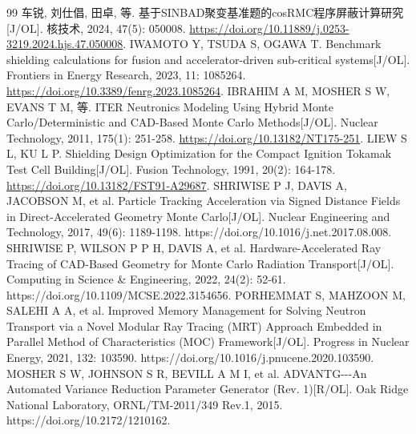 \documentclass[UTF8, zihao=-4, fontset=none, a4paper]{ctexart}
\begin{document}
\begin{thebibliography}{99}
 车锐, 刘仕倡, 田卓, 等. 基于SINBAD聚变基准题的cosRMC程序屏蔽计算研究{[}J/OL{]}. 核技术, 2024, 47(5): 050008. \url{https://doi.org/10.11889/j.0253-3219.2024.hjs.47.050008}.
 IWAMOTO Y, TSUDA S, OGAWA T. Benchmark shielding calculations for fusion and accelerator-driven sub-critical systems{[}J/OL{]}. Frontiers in Energy Research, 2023, 11: 1085264. \url{https://doi.org/10.3389/fenrg.2023.1085264}.
 IBRAHIM A M, MOSHER S W, EVANS T M, 等. ITER Neutronics Modeling Using Hybrid Monte Carlo/Deterministic and CAD-Based Monte Carlo Methods{[}J/OL{]}. Nuclear Technology, 2011, 175(1): 251-258. \url{https://doi.org/10.13182/NT175-251}.
 LIEW S L, KU L P. Shielding Design Optimization for the Compact Ignition Tokamak Test Cell Building{[}J/OL{]}. Fusion Technology, 1991, 20(2): 164-178. \url{https://doi.org/10.13182/FST91-A29687}.
 SHRIWISE P J, DAVIS A, JACOBSON M, et al. Particle Tracking Acceleration via Signed Distance Fields in Direct-Accelerated Geometry Monte Carlo{[}J/OL{]}. Nuclear Engineering and Technology, 2017, 49(6): 1189-1198. https://doi.org/10.1016/j.net.2017.08.008.
 SHRIWISE P, WILSON P P H, DAVIS A, et al. Hardware-Accelerated Ray Tracing of CAD-Based Geometry for Monte Carlo Radiation Transport{[}J/OL{]}. Computing in Science \& Engineering, 2022, 24(2): 52-61. https://doi.org/10.1109/MCSE.2022.3154656.
 PORHEMMAT S, MAHZOON M, SALEHI A A, et al. Improved Memory Management for Solving Neutron Transport via a Novel Modular Ray Tracing (MRT) Approach Embedded in Parallel Method of Characteristics (MOC) Framework{[}J/OL{]}. Progress in Nuclear Energy, 2021, 132: 103590. https://doi.org/10.1016/j.pnucene.2020.103590.
 MOSHER S W, JOHNSON S R, BEVILL A M I, et al. ADVANTG-\/-\/-An Automated Variance Reduction Parameter Generator (Rev. 1){[}R/OL{]}. Oak Ridge National Laboratory, ORNL/TM-2011/349 Rev.1, 2015. https://doi.org/10.2172/1210162.
\end{thebibliography}
\end{document}

